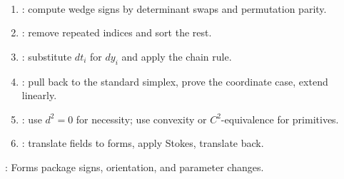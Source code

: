 \begin{method} \label{meth:forms-manifolds-proof-patterns-source-todo}\label{meth:differential-forms-proof-patterns} \\
\begin{enumerate}[label=(\roman*)]
\setlength{\itemsep}{0pt}
\item {}: compute wedge signs by determinant swaps and permutation parity.
\item {}: remove repeated indices and sort the rest.
\item {}: substitute $dt_i$ for $dy_i$ and apply the chain rule.
\item {}: pull back to the standard simplex, prove the coordinate case, extend linearly.
\item {}: use $d^2=0$ for necessity; use convexity or $C^2$-equivalence for primitives.
\item {}: translate fields to forms, apply Stokes, translate back.
\end{enumerate}
: Forms package signs, orientation, and parameter changes.
\end{method}
